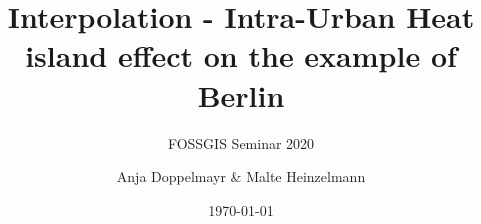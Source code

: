 \documentclass[a4paper,listof=totoc,toc=sectionentrywithdots,abstract=false]{scrartcl}
\title{Interpolation - Intra-Urban Heat island effect on the example of Berlin}
\subtitle{FOSSGIS Seminar 2020}
\date{\today}
\author{Anja Doppelmayr \& Malte Heinzelmann}
\affil{Ruprecht-Karls-Universit\"at Heidelberg}
\begin{document}
\maketitle


\begin{abstract}
	\setlength{\parindent}{0pt}
	
\end{abstract}

\pagebreak





\pagebreak
\appendix
\printbibliography
\end{document}
